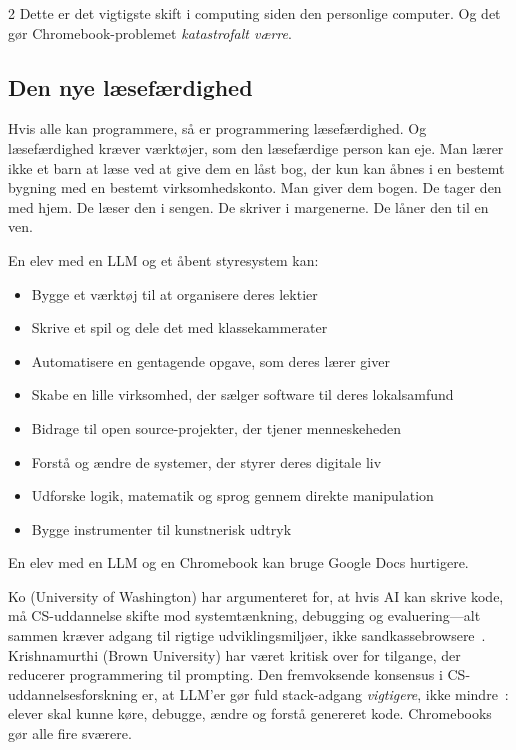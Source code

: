 \documentclass[11pt, a4paper]{article}
\begin{document}
\begin{multicols}{2}
Dette er det vigtigste skift i computing siden den personlige computer. Og det gør Chromebook-problemet \emph{katastrofalt værre}.

\subsection{Den nye læsefærdighed}

Hvis alle kan programmere, så er programmering læsefærdighed. Og læsefærdighed kræver værktøjer, som den læsefærdige person kan eje. Man lærer ikke et barn at læse ved at give dem en låst bog, der kun kan åbnes i en bestemt bygning med en bestemt virksomhedskonto. Man giver dem bogen. De tager den med hjem. De læser den i sengen. De skriver i margenerne. De låner den til en ven.

En elev med en LLM og et åbent styresystem kan:

\begin{itemize}
  \item Bygge et værktøj til at organisere deres lektier
  \item Skrive et spil og dele det med klassekammerater
  \item Automatisere en gentagende opgave, som deres lærer giver
  \item Skabe en lille virksomhed, der sælger software til deres lokalsamfund
  \item Bidrage til open source-projekter, der tjener menneskeheden
  \item Forstå og ændre de systemer, der styrer deres digitale liv
  \item Udforske logik, matematik og sprog gennem direkte manipulation
  \item Bygge instrumenter til kunstnerisk udtryk
\end{itemize}

En elev med en LLM og en Chromebook kan bruge Google Docs hurtigere.

Ko (University of Washington) har argumenteret for, at hvis AI kan skrive kode, må CS-uddannelse skifte mod systemtænkning, debugging og evaluering---alt sammen kræver adgang til rigtige udviklingsmiljøer, ikke sandkassebrowsere~\citep{denny2024computing}. Krishnamurthi (Brown University) har været kritisk over for tilgange, der reducerer programmering til prompting. Den fremvoksende konsensus i CS-uddannelsesforskning er, at LLM'er gør fuld stack-adgang \emph{vigtigere}, ikke mindre~\citep{prather2024robots}: elever skal kunne køre, debugge, ændre og forstå genereret kode. Chromebooks gør alle fire sværere.


\end{multicols}
\end{document}
